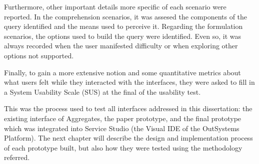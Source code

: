 Furthermore, other important details more specific of each scenario were reported. In the comprehension scenarios, it was assesed the components of the query identified and the means used to perceive it. Regarding the formulation scenarios, the options used to build the query were identified. Even so, it was always recorded when the user manifested difficulty or when exploring other options not supported.

Finally, to gain a more extensive notion and some quantitative metrics about what users felt while they interacted with the interfaces, they were asked to fill in a System Usability Scale (SUS) \cite{system_usability_scale} at the final of the usability test.

This was the process used to test all interfaces addressed in this dissertation: the existing interface of Aggregates, the paper prototype, and the final prototype which was integrated into Service Studio (the Visual \gls{IDE} of the OutSystems Platform). The next chapter will describe the design and implementation process of each prototype built, but also how they were tested using the methodology referred.